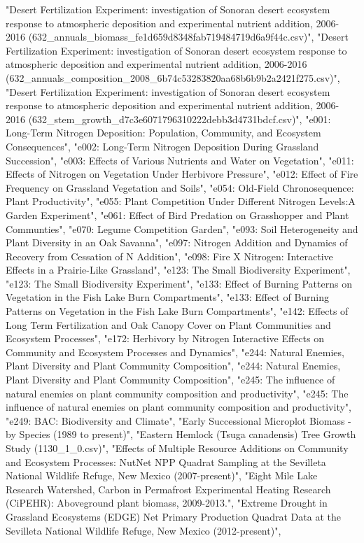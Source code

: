 \documentclass{article}\usepackage[]{graphicx}\usepackage[]{color}
\begin{document}
"Desert Fertilization Experiment: investigation of Sonoran desert ecosystem response to atmospheric deposition and experimental nutrient addition, 2006-2016 (632_annuals_biomass_fe1d659d8348fab719484719d6a9f44c.csv)", "Desert Fertilization Experiment: investigation of Sonoran desert ecosystem response to atmospheric deposition and experimental nutrient addition, 2006-2016 (632_annuals_composition_2008_6b74c53283820aa68b6b9b2a2421f275.csv)", "Desert Fertilization Experiment: investigation of Sonoran desert ecosystem response to atmospheric deposition and experimental nutrient addition, 2006-2016 (632_stem_growth_d7c3e6071796310222debb3d4731bdcf.csv)", 
"e001: Long-Term Nitrogen Deposition: Population, Community, and Ecosystem Consequences", "e002: Long-Term Nitrogen Deposition During Grassland Succession", "e003: Effects of Various Nutrients and Water on Vegetation", "e011: Effects of Nitrogen on Vegetation Under Herbivore Pressure", "e012: Effect of Fire Frequency on Grassland Vegetation and Soils", "e054: Old-Field Chronosequence:  Plant Productivity", "e055: Plant Competition Under Different Nitrogen Levels:A Garden Experiment", "e061: Effect of Bird Predation on Grasshopper and Plant Communties", 
"e070: Legume Competition Garden", "e093: Soil Heterogeneity and Plant Diversity in an Oak Savanna", "e097: Nitrogen Addition and Dynamics of Recovery from Cessation of N Addition", "e098: Fire X Nitrogen: Interactive Effects in a Prairie-Like Grassland", "e123: The Small Biodiversity Experiment", "e123: The Small Biodiversity Experiment", "e133: Effect of Burning Patterns on Vegetation in the Fish Lake Burn Compartments", "e133: Effect of Burning Patterns on Vegetation in the Fish Lake Burn Compartments", 
"e142: Effects of Long Term Fertilization and Oak Canopy Cover on Plant Communities and Ecosystem Processes", "e172: Herbivory by Nitrogen Interactive Effects on Community and Ecosystem Processes and Dynamics", "e244: Natural Enemies, Plant Diversity and Plant Community Composition", "e244: Natural Enemies, Plant Diversity and Plant Community Composition", "e245: The influence of natural enemies on plant community composition and productivity", "e245: The influence of natural enemies on plant community composition and productivity", 
"e249: BAC: Biodiversity and Climate", "Early Successional Microplot Biomass - by Species (1989 to present)", "Eastern Hemlock (Tsuga canadensis) Tree Growth Study (1130_1_0.csv)", "Effects of Multiple Resource Additions on Community and Ecosystem Processes: NutNet NPP Quadrat Sampling at the Sevilleta National Wildlife Refuge, New Mexico (2007-present)", "Eight Mile Lake Research Watershed, Carbon in Permafrost Experimental Heating Research (CiPEHR): Aboveground plant biomass, 2009-2013.", "Extreme Drought in Grassland Ecosystems (EDGE) Net Primary Production Quadrat Data at the Sevilleta National Wildlife Refuge, New Mexico (2012-present)", 
\end{document}
